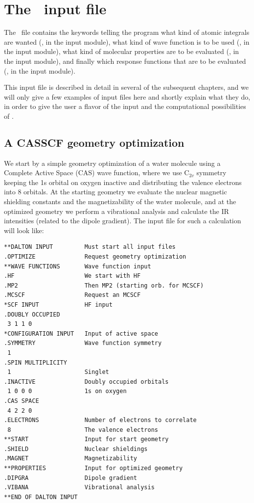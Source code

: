 \section{The \dalinp\ input file}\label{sec:daltoninp}

The \dalinp\ file contains the keywords telling the program
what kind of atomic integrals are wanted
({\her}, in the  input module), what kind of wave
function is to be used ({\sir}, in the
 input
module), what kind of molecular properties  are
to be evaluated (\aba , in the  input module), and
finally which response functions that are to
be evaluated (\resp , in
the  input module).

This input file is described in detail in several of the subsequent chapters,
and we will  only give a few examples of input files here and shortly
explain what they do, in order to give the user a flavor of the input
and the computational possibilities
of {\dalton}.

\subsection{A CASSCF geometry optimization}

We start by a simple geometry optimization 
of a water molecule using a Complete 
Active Space (CAS) wave function, where we use C$_{2v}$ symmetry
keeping the 1s orbital on oxygen inactive and distributing the valence
electrons  into 8 orbitals. At the starting geometry we
evaluate the nuclear magnetic shielding constants 
and the magnetizability of the water
molecule, and at the optimized geometry we perform a vibrational
analysis and calculate the IR
intensities 
(related to the dipole
gradient). The input file for such a calculation will look like:

\begin{verbatim}
**DALTON INPUT         Must start all input files
.OPTIMIZE              Request geometry optimization
**WAVE FUNCTIONS       Wave function input
.HF                    We start with HF
.MP2                   Then MP2 (starting orb. for MCSCF)
.MCSCF                 Request an MCSCF
*SCF INPUT             HF input
.DOUBLY OCCUPIED
 3 1 1 0
*CONFIGURATION INPUT   Input of active space
.SYMMETRY              Wave function symmetry
 1
.SPIN MULTIPLICITY
 1                     Singlet
.INACTIVE              Doubly occupied orbitals
 1 0 0 0               1s on oxygen
.CAS SPACE
 4 2 2 0
.ELECTRONS             Number of electrons to correlate
 8                     The valence electrons
**START                Input for start geometry
.SHIELD                Nuclear shieldings
.MAGNET                Magnetizability
**PROPERTIES           Input for optimized geometry
.DIPGRA                Dipole gradient
.VIBANA                Vibrational analysis
**END OF DALTON INPUT
\end{verbatim}

